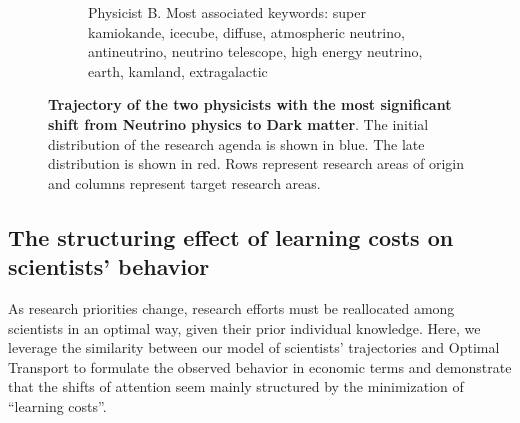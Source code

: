 \documentclass{article}
\begin{document}
\begin{figure}[h]
\begin{subfigure}{0.45\textwidth}
    \caption{Physicist B. Most associated keywords: super kamiokande, icecube, diffuse, atmospheric neutrino, antineutrino, neutrino telescope, high energy neutrino, earth, kamland, extragalactic}
    \label{fig:J.F.Beacom.1}
\end{subfigure}
\caption{\textbf{Trajectory of the two physicists with the most significant shift from Neutrino physics to Dark matter}. The initial distribution of the research agenda is shown in blue. The late distribution is shown in red. Rows represent research areas of origin and columns represent target research areas.}
\label{fig:turns_neutrinos_dm}
\end{figure}

\subsection{\label{sec:optimal-transport}The structuring effect of learning costs on scientists' behavior}

As research priorities change, research efforts must be reallocated among scientists in an optimal way, given their prior individual knowledge. Here, we leverage the similarity between our model of scientists' trajectories and Optimal Transport \citep{muzellec2017tsallis,li2019learning} to formulate the observed behavior in economic terms and demonstrate that the shifts of attention seem mainly structured by the minimization of ``learning costs''. 
\end{document}
